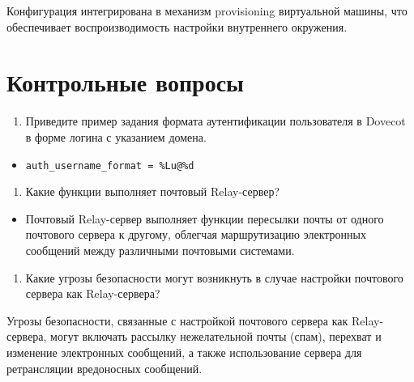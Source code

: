 \documentclass[
  12pt,
  a4paper,
  DIV=11,
  numbers=noendperiod]{scrreprt}
\providecommand{\tightlist}{%
  \setlength{\itemsep}{0pt}\setlength{\parskip}{0pt}}\usepackage{longtable,booktabs,array}
\begin{document}
Конфигурация интегрирована в механизм provisioning виртуальной машины,
что обеспечивает воспроизводимость настройки внутреннего окружения.

\chapter{Контрольные
вопросы}\label{ux43aux43eux43dux442ux440ux43eux43bux44cux43dux44bux435-ux432ux43eux43fux440ux43eux441ux44b}

\begin{enumerate}
\def\labelenumi{\arabic{enumi}.}
\tightlist
\item
  Приведите пример задания формата аутентификации пользователя в Dovecot
  в форме логина с указанием домена.
\end{enumerate}

\begin{itemize}
\tightlist
\item
  \texttt{auth\_username\_format\ =\ \%Lu@\%d}
\end{itemize}

\begin{enumerate}
\def\labelenumi{\arabic{enumi}.}
\setcounter{enumi}{1}
\tightlist
\item
  Какие функции выполняет почтовый Relay-сервер?
\end{enumerate}

\begin{itemize}
\tightlist
\item
  Почтовый Relay-сервер выполняет функции пересылки почты от одного
  почтового сервера к другому, облегчая маршрутизацию электронных
  сообщений между различными почтовыми системами.
\end{itemize}

\begin{enumerate}
\def\labelenumi{\arabic{enumi}.}
\setcounter{enumi}{2}
\tightlist
\item
  Какие угрозы безопасности могут возникнуть в случае настройки
  почтового сервера как Relay-сервера?
\end{enumerate}

Угрозы безопасности, связанные с настройкой почтового сервера как
Relay-сервера, могут включать рассылку нежелательной почты (спам),
перехват и изменение электронных сообщений, а также использование
сервера для ретрансляции вредоносных сообщений.


\printbibliography
\end{document}
